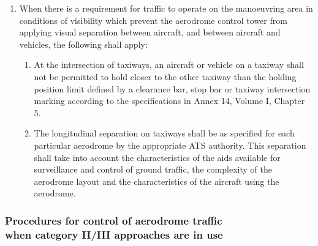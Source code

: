 \documentclass[../vATM.tex]{subfiles}
\begin{document}
    \begin{enumerate}
        \item When there is a requirement for traffic to operate on the manoeuvring area in conditions of visibility which prevent the aerodrome control tower from applying visual separation between aircraft, and between aircraft and vehicles, the following shall apply:

        \begin{enumerate}
            \item At the intersection of taxiways, an aircraft or vehicle on a taxiway shall not be permitted to hold closer to the other taxiway than the holding position limit defined by a clearance bar, stop bar or taxiway intersection marking according to the specifications in Annex 14, Volume I, Chapter 5.
            \item The longitudinal separation on taxiways shall be as specified for each particular aerodrome by the appropriate ATS authority. This separation shall take into account the characteristics of the aids available for surveillance and control of ground traffic, the complexity of the aerodrome layout and the characteristics of the aircraft using the aerodrome.
        \end{enumerate}

    \end{enumerate}

    \subsubsection[Procedures for control of aerodrome traffic when category II/III approaches are in use]{Procedures for control of aerodrome traffic \\ when category II/III approaches are in use} \label{7.12.2}
\end{document}
